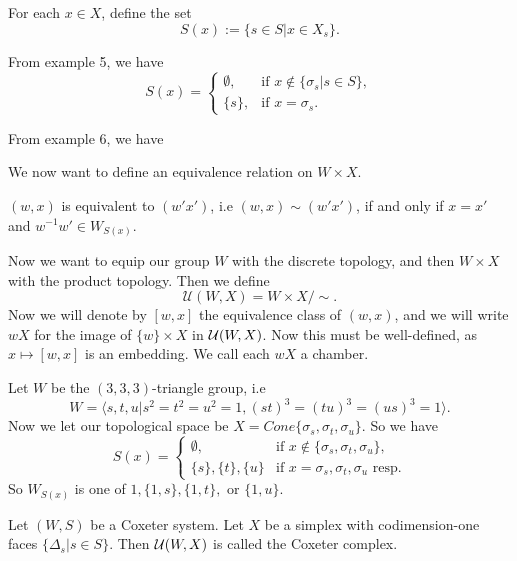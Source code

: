 \documentclass[12pt]{article}
\begin{document}
\begin{definition}
    For each $x\in X$, define the set
    \[S(x):=\{s\in S|x\in X_s\}.\]
\end{definition}

\begin{example}
    From example 5, we have
    \[S(x)=\begin{cases}\emptyset, & \text{if } x\notin \{\sigma_s|s\in S\},\\
        \{s\}, & \text{if } x=\sigma_s.
    \end{cases}\]
\end{example}

\begin{example}
    From example 6, we have
    \[\]
\end{example}

We now want to define an equivalence relation on $W\times X$. 
\begin{definition}
    $(w,x)$ is equivalent to $(w'x')$, i.e $(w,x)\sim (w'x')$, if and only if $x=x'$ and $w^{-1}w'\in W_{S(x)}.$  
\end{definition}

Now we want to equip our group $W$ with the discrete topology, and then $W\times X$ with the product topology. Then we define
\[\mathcal{U}(W,X)=W\times X/\sim.\]
Now we will denote by $[w,x]$ the equivalence class of $(w,x)$, and we will write $wX$ for the image of $\{w\}\times X$ in $\mathcal{U}(W,X)$. Now this must be well-defined, as $x\mapsto [w,x]$ is an embedding. We call each $wX$ a chamber. 

\begin{example}
    Let $W$ be the $(3,3,3)$-triangle group, i.e
    \[W=\langle s,t,u|s^2=t^2=u^2=1,(st)^3=(tu)^3=(us)^3=1\rangle.\]
    Now we let our topological space be $X=Cone\{\sigma_s,\sigma_t,\sigma_u\}$. So we have
    \[S(x)=\begin{cases}
        \emptyset, & \text{if } x\notin \{\sigma_s,\sigma_t,\sigma_u\},\\
        \{s\}, \{t\}, \{u\} & \text{if } x=\sigma_s,\sigma_t,\sigma_u \text{ resp.}
    \end{cases}\]
    So $W_{S(x)}$ is one of $1, \{1,s\},\{1,t\},$ or $\{1,u\}$. 
\end{example}

\begin{definition}
    Let $(W,S)$ be a Coxeter system. Let $X$ be a simplex with codimension-one faces $\{\Delta_s|s\in S\}$. Then $\mathcal{U}(W,X)$ is called the Coxeter complex.
\end{definition}
\end{document}
